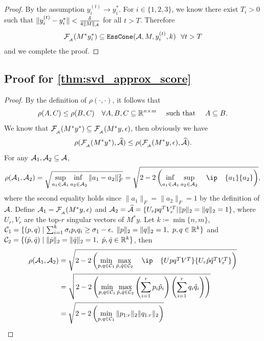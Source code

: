 \begin{proof}
    By the assumption $y_i^{(t)} \to y_i^*$. For $i \in \{1,2,3\}$, we know there exist $T_i > 0$ such that $\| y_i^{(t)} - y_i^* \| < \frac{\delta}{4\| M \|_{\mathcal{A}}}$ for all $t > T$. Therefore 
    \[\mathcal{F}_{\scriptscriptstyle _{\scriptscriptstyle\mathcal{A}}}( M^* y_i^*) \subseteq \texttt{EssCone}(\mathcal{A}, M, y_i^{(t)}, k)~~\forall t > T\] 
    and we complete the proof.
\end{proof}

\subsection{Proof for \autoref{thm:svd_approx_score}}
\begin{proof}
  By the definition of $\rho(\cdot, \cdot)$, it follows that
  \[
    \rho(A, C) \leq \rho(B, C) \quad \forall A, B, C \subseteq \mathbb{R}^{n \times m} ~\hbox{\quad such that\quad}~ A \subseteq B.
  \]
  We know that $ \mathcal{F}_{\scriptscriptstyle _{\scriptscriptstyle\mathcal{A}}}( M^* y^* ) \subseteq  \mathcal{F}_{\scriptscriptstyle _{\scriptscriptstyle\mathcal{A}}}( M^* y, \epsilon )$, then obviously we have 
  \[
    \rho( \mathcal{F}_{\scriptscriptstyle _{\scriptscriptstyle\mathcal{A}}}( M^* y^* ), \widehat{\mathcal{A}}  ) \leq \rho( \mathcal{F}_{\scriptscriptstyle _{\scriptscriptstyle\mathcal{A}}}( M^* y, \epsilon ), \widehat{\mathcal{A}}  ).
  \]
  For any $\mathcal{A}_1, \mathcal{A}_2 \subseteq \mathcal{A}$,
  \begin{align}
    \rho( \Ascr_1, \Ascr_2 ) = \sqrt{ \adjustlimits\sup_{a_1 \in \Ascr_1} \inf_{a_2 \in \Ascr_2} \| a_1 - a_2 \|_F^2 } = \sqrt{ 2 - 2 \left( \adjustlimits \inf_{a_1 \in \Ascr_1} \sup_{a_2 \in \Ascr_2} \ip{a_1}{a_2} \right) }, \label{eq:norm2ip}
  \end{align}
  where the second equality holds since $\| a_1 \|_F = \| a_2 \|_F = 1$ by the definition of $\mathcal{A}$. Define $\mathcal{A}_1 = \mathcal{F}_{\scriptscriptstyle _{\scriptscriptstyle\mathcal{A}}}( M^* y, \epsilon )$ and $\mathcal{A}_2 = \widehat{\mathcal{A}} = \{ U_r p q^T V_r^T | \|p\|_2 = \|q\|_2 = 1 \}$, where $U_r, V_r$ are the top-$r$ singular vectors of $M^*y$. Let $k \coloneqq \min\{n,m\}$, $\mathcal{C}_1 = \{(p, q) \mid \sum_{i=1}^{k} \sigma_i p_i q_i \geq \sigma_1 - \epsilon,~ \|p\|_2 = \|q\|_2 = 1, ~p,q \in \mathbb{R}^{ k }\}$ and $\mathcal{C}_2 = \{(\hat{p}, \hat{q}) \mid \|\hat{p}\|_2 = \|\hat{q}\|_2 = 1, ~\hat{p},\hat{q} \in \mathbb{R}^{ k }\}$, then
  \begin{align}
    \rho( \Ascr_1, \Ascr_2  ) & = \sqrt{ 2 - 2 \left( \min_{p, q \in \Cscr_1} \max_{ \hat{p}, \hat{q} \in \Cscr_2} \ip{ Up q^T V^T }{ U_r \hat{p} \hat{q}^T V_r^T } \right) } \nonumber \\
    & = \sqrt{ 2 - 2 \left( \min_{p, q \in \Cscr_1} \max_{ \hat{p}, \hat{q} \in \Cscr_2} \left( \sum_{i=1}^r p_i \hat{p}_i \right) \left( \sum_{i=1}^r q_i \hat{q}_i \right) \right) } \nonumber \\
    & = \sqrt{ 2 - 2 \left(\min_{p, q \in \Cscr_1} \| p_{1:r} \|_2 \| q_{1:r} \|_2 \right) } \label{eq:rho_exp} 

\end{align}
\end{proof}
